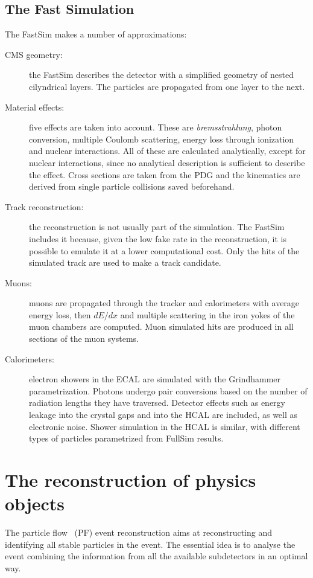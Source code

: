 \subsection{The Fast Simulation}
The FastSim makes a number of approximations:
\begin{description}
    \item[CMS geometry:] the FastSim describes the detector with a simplified geometry of nested cilyndrical layers. The particles are propagated from one layer to the next.
    \item[Material effects:] five effects are taken into account. These are \emph{bremsstrahlung}, photon conversion, multiple Coulomb scattering, energy loss through ionization and nuclear interactions. All of these are calculated analytically, except for nuclear interactions, since no analytical description is sufficient to describe the effect. Cross sections are taken from the PDG and the kinematics are derived from single particle collisions saved beforehand.
    \item[Track reconstruction:] the reconstruction is not usually part of the simulation. The FastSim includes it because, given the low fake rate in the reconstruction, it is possible to emulate it at a lower computational cost. Only the hits of the simulated track are used to make a track candidate. 
    \item[Muons:] muons are propagated through the tracker and calorimeters with average energy loss, then $dE/dx$ and multiple scattering in the iron yokes of the muon chambers are computed. Muon simulated hits are produced in all sections of the muon systems.
    \item[Calorimeters:] electron showers in the ECAL are simulated with the Grindhammer~\cite{fs:grindhammer} parametrization. Photons undergo pair conversions based on the number of radiation lengths they have traversed. Detector effects such as energy leakage into the crystal gaps and into the HCAL are included, as well as electronic noise. Shower simulation in the HCAL is similar, with different types of particles parametrized from FullSim results.
\end{description}

\section{The reconstruction of physics objects}
The particle flow~\cite{pf:particle.flow} (PF) event reconstruction aims at reconstructing and identifying all stable particles in the event. The essential idea is to analyse the event combining the information from all the available subdetectors in an optimal way.

